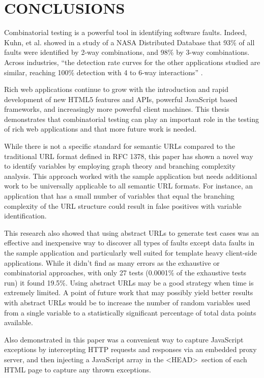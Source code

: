 \chapter{\uppercase{Conclusions}}

Combinatorial testing is a powerful tool in identifying software faults.  Indeed, Kuhn, et al. showed in a study of a NASA Distributed Database that 93\% of all faults were identified by 2-way combinations, and 98\% by 3-way combinations.  Across industries, ``the detection rate curves for the other applications studied are similar, reaching 100\% detection with 4 to 6-way interactions'' \cite{kuhn2010practical}.  

Rich web applications continue to grow with the introduction and rapid development of new HTML5 features and APIs, powerful JavaScript based frameworks, and increasingly more powerful client machines.  This thesis demonstrates that combinatorial testing can play an important role in the testing of rich web applications and that more future work is needed.

While there is not a specific standard for semantic URLs compared to the traditional URL format defined in RFC 1378, this paper has shown a novel way to identify variables by employing graph theory and branching complexity analysis.  This approach worked with the sample application but needs additional work to be universally applicable to all semantic URL formats.  For instance, an application that has a small number of variables that equal the branching complexity of the URL structure could result in false positives with variable identification.

This research also showed that using abstract URLs to generate test cases was an effective and inexpensive way to discover all types of faults except data faults in the sample application and particularly well suited for template heavy client-side applications.  While it didn't find as many errors as the exhaustive or combinatorial approaches, with only 27 tests (0.0001\% of the exhaustive tests run) it found 19.5\%.  Using abstract URLs may be a good strategy when time is extremely limited.  A point of future work that may possibly yield better results with abstract URLs would be to increase the number of random variables used from a single variable to a statistically significant percentage of total data points available.

Also demonstrated in this paper was a convenient way to capture JavaScript exceptions by intercepting HTTP requests and responses via an embedded proxy server, and then injecting a JavaScript array in the \textless HEAD\textgreater\ section of each HTML page to capture any thrown exceptions.

